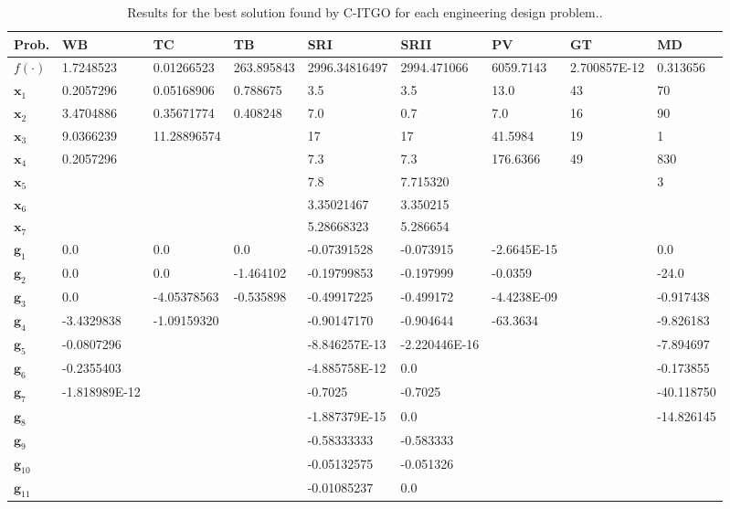 
\noindent
\begin{table*}[tp]
    \tiny
\begin{center}
\begin{adjustwidth}{-1cm}{}
\begin{tabular}{ | P{1.0cm} | P{1.5cm} |  P{1.5cm} | P{1.5cm} | P{1.5cm} | P{1.5cm} | P{1.5cm} | P{1.5cm} | P{1.5cm} |  }
\hline
\textbf{Prob.} & \textbf{WB} & \textbf{TC} & \textbf{TB} & \textbf{SRI} & \textbf{SRII} & \textbf{PV} & \textbf{GT} & \textbf{MD} \\
\hline
\rule{0pt}{3ex}
$f(\cdot)$ & 1.7248523 & 0.01266523 & 263.895843 & 2996.34816497 & 2994.471066 & 6059.7143 & 2.700857E-12 & 0.313656 \\
\hline
\rule{0pt}{3ex}
$\bm{x}_1$ &  0.2057296 & 0.05168906 & 0.788675 & 3.5 & 3.5 & 13.0 & 43 & 70  \\
$\bm{x}_2$ &  3.4704886 & 0.35671774 & 0.408248 & 7.0 & 0.7 & 7.0 & 16 & 90 \\
$\bm{x}_3$ &  9.0366239 & 11.28896574 & & 17 & 17 & 41.5984 & 19 &  1  \\
$\bm{x}_4$ &  0.2057296 & & & 7.3 & 7.3 & 176.6366 & 49 & 830  \\
$\bm{x}_5$ & & & & 7.8 & 7.715320 & & & 3 \\
$\bm{x}_6$ & & & & 3.35021467 & 3.350215 & & &   \\
$\bm{x}_7$ & & & & 5.28668323 & 5.286654 & & &   \\
\hline
\rule{0pt}{3ex}
$\bm{g}_1$ & 0.0 & 0.0 & 0.0 & -0.07391528 & -0.073915 & -2.6645E-15 & & 0.0  \\
$\bm{g}_2$ & 0.0 & 0.0 & -1.464102 & -0.19799853 & -0.197999 & -0.0359 & & -24.0  \\
$\bm{g}_3$ & 0.0 & -4.05378563 & -0.535898 & -0.49917225 & -0.499172 & -4.4238E-09 & & -0.917438 \\
$\bm{g}_4$ & -3.4329838 & -1.09159320 & & -0.90147170 & -0.904644 & -63.3634 & & -9.826183  \\
$\bm{g}_5$ & -0.0807296 & & & -8.846257E-13 & -2.220446E-16 & & &  -7.894697 \\
$\bm{g}_6$ & -0.2355403 & & & -4.885758E-12 & 0.0 & & & -0.173855  \\
$\bm{g}_7$ & -1.818989E-12 & & & -0.7025 & -0.7025 & & & -40.118750 \\
$\bm{g}_8$ & & & & -1.887379E-15 & 0.0 & & &  -14.826145 \\
$\bm{g}_9$ & & & & -0.58333333 & -0.583333 & & &    \\
$\bm{g}_{10}$ & & & & -0.05132575 & -0.051326 & & &    \\
$\bm{g}_{11}$ & & & & -0.01085237 & 0.0 & & &    \\
\hline
\end{tabular}
\end{adjustwidth}
\end{center}
\vspace*{-6mm}
\caption{Results for the best solution found by C-ITGO for each engineering design problem.. \\[1em]}
\label{tab:BestResults}
\end{table*}

